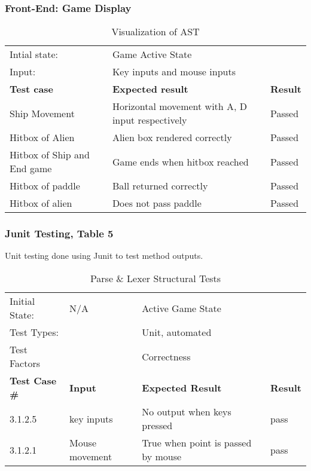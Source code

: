 \documentclass[12pt, oneside]{article}
\begin{document}
\subsubsection{Front-End: Game Display}


\begin{table}[ht]
\label{gui}
\caption{Visualization of AST}
\begin{tabular}{|p{} || p{}| || p{}|}
\hline
Intial state:  & Game Active State & \\
Input:  & Key inputs and mouse inputs & \\
\hline
\hline
\textbf{Test case} & \textbf{Expected result} & \textbf{Result}\\
\hline
Ship Movement & Horizontal movement with A, D input respectively & Passed \\
\hline
Hitbox of Alien & Alien box rendered correctly & Passed \\
\hline
Hitbox of Ship and End game & Game ends when hitbox reached & Passed \\
\hline 
Hitbox of paddle & Ball returned correctly & Passed \\
\hline
Hitbox of alien & Does not pass paddle & Passed \\
\hline

\end{tabular}
\end{table}

\subsubsection{Junit Testing, Table 5}
Unit testing done using Junit to test method outputs.

\begin{table}[ht]
\label{stack}
\caption{Parse \& Lexer Structural Tests}
\begin{tabular}{|p{} || p{} || p{} || p{}|}
\hline
Initial State: & N/A & Active Game State & \\
Test Types: & & Unit, automated & \\
Test Factors & & Correctness & \\
\hline
\hline
\textbf{Test Case \#} & \textbf{Input} & \textbf{Expected Result} & \textbf{Result} \\
\hline
3.1.2.5 & key inputs & No output when keys pressed & pass\\
3.1.2.1 & Mouse movement & True when point is passed by mouse & pass\\
\hline
\end{tabular}
\end{table}
\end{document}
